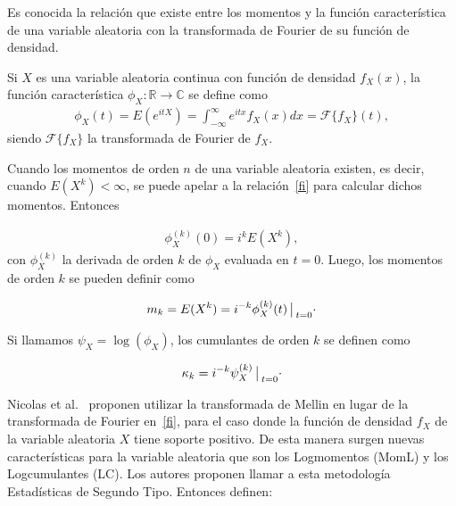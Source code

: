 Es conocida la relación que existe entre los momentos y la función característica de una variable aleatoria con la transformada de Fourier de su función de densidad. 

\begin{definition}
Si $X$ es una variable aleatoria continua con función de densidad $f_X(x)$, la función característica $\phi_X: \mathbb{R} \rightarrow \mathbb{C}$ se define como 
\begin{align}
\phi_X(t)=E(e^{itX})=\int_{-\infty}^{\infty} e^{itx} f_X(x) dx = \mathcal{F}\{f_X\}(t),
\label{fi}
\end{align}
siendo $\mathcal{F}\{f_X\}$ la transformada de Fourier de $f_X$.
\end{definition}

Cuando los momentos de orden $n$ de una variable aleatoria existen, es decir, cuando $E(X^k)< \infty$, se puede apelar a la relación~\eqref{fi} para calcular dichos momentos. Entonces

\begin{align}
\phi_X^{(k)}(0)=i^k E(X^k),
\label{fi}
\end{align}
con $\phi_X^{(k)}$ la derivada de orden $k$ de $\phi_X$ evaluada en $t=0$. Luego, los momentos de orden $k$ se pueden definir como 

\begin{align}
\label{MomentosPrimerTipo}
m_k=E(X^k)=i^{-k} \phi_X^{(k)}(t)\big\arrowvert _{t=0}\cdot
\end{align}

Si llamamos $\psi_X=\log(\phi_X)$, los cumulantes de orden $k$ se definen como 

\begin{align}
\label{CumulantePrimerTipo}
\kappa_k=i^{-k} \psi_X^{(k)}\big\arrowvert _{t=0}\cdot
\end{align}

Nicolas et al.~\cite{nicolas2002} proponen utilizar la transformada de Mellin en lugar de la transformada de Fourier en~\eqref{fi}, para el caso donde la función de densidad $f_X$ de la variable aleatoria $X$ tiene soporte positivo. De esta manera surgen nuevas características para la variable aleatoria que son los Logmomentos (MomL) y los  Logcumulantes (LC). Los autores proponen llamar a esta metodología Estadísticas de Segundo Tipo. Entonces definen:


